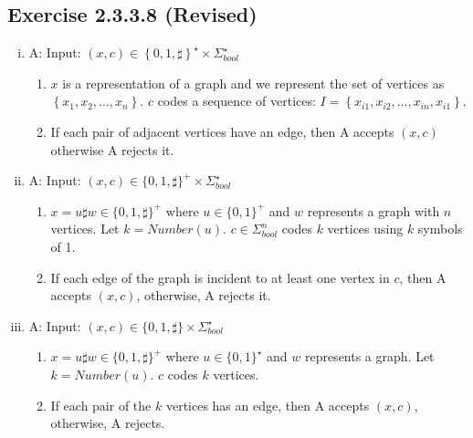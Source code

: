 \documentclass[twocolumn, 10.5pt]{article}
\begin{document}
	\subsection*{Exercise 2.3.3.8 (Revised)}
	\begin{enumerate}[(i)]
		\item A: Input: $(x,c)\in \left\{
		0,1,\sharp\right\}^\star\times \Sigma^\star_{bool}$
		\begin{enumerate}[(1)]
			\item 
			$x$ is a representation of a graph and we represent the set of vertices as $\left\{x_1,x_2,\dots,x_n\right\}$. $c$ codes a sequence of vertices: $I=\left\{x_{i1},x_{i2},\dots,x_{in},x_{i1}\right\}$.
			\item  If each pair of adjacent vertices have an edge, then A accepts $(x,c)$ otherwise A rejects it. 
		\end{enumerate}
		\item 
		A: Input: $(x,c)\in \{0,1,\sharp\}^+\times \Sigma_{bool}^{\star}$
		\begin{enumerate}[(1)]
			\item 
			$x=u\sharp w\in\{0,1,\sharp\}^+$ where $u\in\{0,1\}^+$ and $w$ represents a graph with $n$ vertices. Let $k=Number(u)$. $c\in \Sigma_{bool}^n$ codes $k$ vertices using $k$ symbols of 1.
			\item 
			If each edge of the graph is incident to at least one vertex in $c$, then A accepts $(x,c)$, otherwise, A rejects it. 
		\end{enumerate}
		\item 
		A: Input: $(x,c)\in\{0,1,\sharp\}\times \Sigma_{bool}^\star$
		\begin{enumerate}[(1)]
			\item 
			$x=u\sharp w\in\{0,1,\sharp\}^+$ where $u\in\{0,1\}^\star$ and $w$ represents a graph. Let $k=Number(u)$. $c$ codes $k$ vertices.
			\item 
			If each pair of the $k$ vertices has an edge, then A accepts $(x,c)$, otherwise, A rejects. 
		\end{enumerate}
	\end{enumerate}
\end{document}
